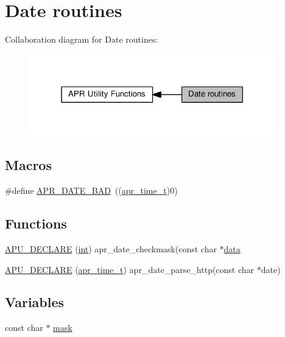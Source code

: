 \hypertarget{group__APR__Util__Date}{}\section{Date routines}
\label{group__APR__Util__Date}
Collaboration diagram for Date routines\+:
\nopagebreak
\begin{figure}[H]
\begin{center}
\leavevmode
\includegraphics[width=303pt]{group__APR__Util__Date}
\end{center}
\end{figure}
\subsection*{Macros}
\begin{DoxyCompactItemize}
\item 
\#define \hyperlink{group__APR__Util__Date_ga8be88b25f4b477ad13c4067c959411b0}{A\+P\+R\+\_\+\+D\+A\+T\+E\+\_\+\+B\+AD}~((\hyperlink{group__apr__time_gadb4bde16055748190eae190c55aa02bb}{apr\+\_\+time\+\_\+t})0)
\end{DoxyCompactItemize}
\subsection*{Functions}
\begin{DoxyCompactItemize}
\item 
\hyperlink{group__APR__Util__Date_ga4a4f99fb264d6c243cbbcb106c8e08c7}{A\+P\+U\+\_\+\+D\+E\+C\+L\+A\+RE} (\hyperlink{pcre_8txt_a42dfa4ff673c82d8efe7144098fbc198}{int}) apr\+\_\+date\+\_\+checkmask(const char $\ast$\hyperlink{structdata}{data}
\item 
\hyperlink{group__APR__Util__Date_ga9e15cdbb028ab9a85bfcc48eb7e842e9}{A\+P\+U\+\_\+\+D\+E\+C\+L\+A\+RE} (\hyperlink{group__apr__time_gadb4bde16055748190eae190c55aa02bb}{apr\+\_\+time\+\_\+t}) apr\+\_\+date\+\_\+parse\+\_\+http(const char $\ast$date)
\end{DoxyCompactItemize}
\subsection*{Variables}
\begin{DoxyCompactItemize}
\item 
const char $\ast$ \hyperlink{group__APR__Util__Date_ga6bd7250007a3cfeadacf370fbf68cf5a}{mask}
\end{DoxyCompactItemize}


